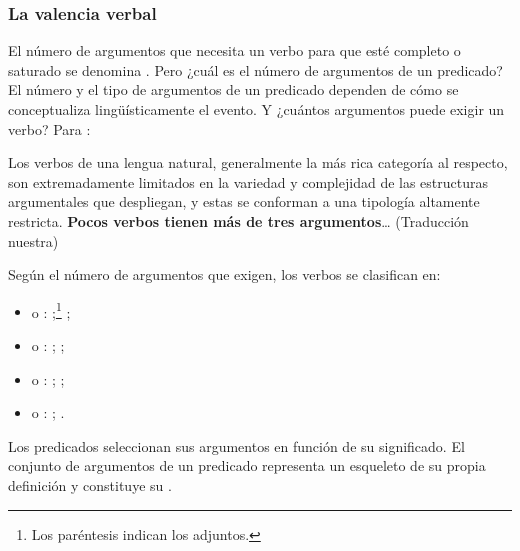 \subsubsection{La valencia verbal}\label{sec:07-valencia}

El número de argumentos que necesita un verbo para que esté completo o saturado
se denomina . Pero ¿cuál es el número de argumentos de
un predicado? El número y el tipo de argumentos de un predicado dependen de cómo
se conceptualiza lingüísticamente el evento. Y ¿cuántos argumentos puede exigir
un verbo? Para \textcite{hale1998}:

\begin{cita}
Los verbos de una lengua natural, generalmente la más rica categoría al
respecto, son extremadamente limitados en la variedad y complejidad de las
estructuras argumentales que despliegan, y estas se conforman a una tipología
altamente restricta. \textbf{Pocos verbos tienen más de tres argumentos}\ldots{}
(Traducción nuestra)
\end{cita}

Según el número de argumentos que exigen, los verbos se clasifican en:

\begin{itemize}
  \item {} o : ;\footnote{Los paréntesis indican los adjuntos.}
        ;
  \item {} o : ; ;
  \item {} o : ; ;
  \item {} o : ; .
\end{itemize}

Los predicados seleccionan sus argumentos en función de su significado. El
conjunto de argumentos de un predicado representa un esqueleto de su propia
definición y constituye su .

